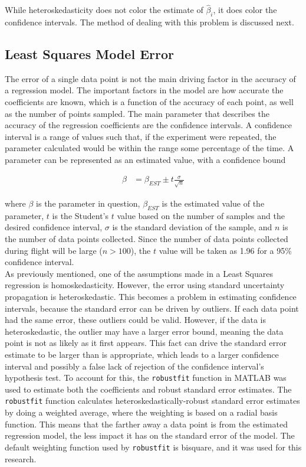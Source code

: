 While heteroskedasticity does not color the estimate of $\hat{\beta}_i$, it does color the confidence intervals. The method of dealing with this problem is discussed next.


\subsection*{Least Squares Model Error}
The error of a single data point is not the main driving factor in the accuracy of a regression model. The important factors in the model are how accurate the coefficients are known, which is a function of the accuracy of each point, as well as the number of points sampled. The main parameter that describes the accuracy of the regression coefficients are the confidence intervals. A confidence interval is a range of values such that, if the experiment were repeated, the parameter calculated would be within the range some percentage of the time. A parameter can be represented as an estimated value, with a confidence bound

\begin{align}
\label{confidenceInterval}
\beta &= \beta_{EST} \pm t\frac{\sigma}{\sqrt{n}}
\end{align}

where $\beta$ is the parameter in question, $\beta_{EST}$ is the estimated value of the parameter, $t$ is the Student's $t$ value based on the number of samples and the desired confidence interval, $\sigma$ is the standard deviation of the sample, and $n$ is the number of data points collected. Since the number of data points collected during flight will be large ($n>100$), the $t$ value will be taken as 1.96 for a 95\% confidence interval.\\
As previously mentioned, one of the assumptions made in a Least Squares regression is homoskedasticity. However, the error using standard uncertainty propagation is heteroskedastic. This becomes a problem in estimating confidence intervals, because the standard error can be driven by outliers. If each data point had the same error, these outliers could be valid. However, if the data is heteroskedastic, the outlier may have a larger error bound, meaning the data point is not as likely as it first appears. This fact can drive the standard error estimate to be larger than is appropriate, which leads to a larger confidence interval and possibly a false lack of rejection of the confidence interval's hypothesis test. To account for this, the \texttt{robustfit} function in MATLAB  was used to estimate both the coefficients and robust standard error estimates. The \texttt{robustfit} function calculates heteroskedastically-robust standard error estimates by doing a weighted average, where the weighting is based on a radial basis function. This means that the farther away a data point is from the estimated regression model, the less impact it has on the standard error of the model. The default weighting function used by \texttt{robustfit} is bisquare, and it was used for this research.

